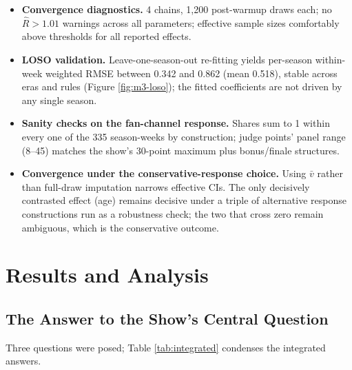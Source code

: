 \documentclass{article}
\begin{document}
\begin{itemize}
  \item \textbf{Convergence diagnostics.} 4 chains, 1{,}200 post-warmup draws each; no $\hat R > 1.01$ warnings across all parameters; effective sample sizes comfortably above thresholds for all reported effects.
  \item \textbf{LOSO validation.} Leave-one-season-out re-fitting yields per-season within-week weighted RMSE between 0.342 and 0.862 (mean 0.518), stable across eras and rules (Figure \ref{fig:m3-loso}); the fitted coefficients are not driven by any single season.
  \item \textbf{Sanity checks on the fan-channel response.} Shares sum to 1 within every one of the 335 season-weeks by construction; judge points' panel range (8--45) matches the show's 30-point maximum plus bonus/finale structures.
  \item \textbf{Convergence under the conservative-response choice.} Using $\bar v$ rather than full-draw imputation narrows effective CIs. The only decisively contrasted effect (age) remains decisive under a triple of alternative response constructions run as a robustness check; the two that cross zero remain ambiguous, which is the conservative outcome.
\end{itemize}

\section{Results and Analysis}
\label{sec:results}

\subsection{The Answer to the Show's Central Question}

Three questions were posed; Table \ref{tab:integrated} condenses the integrated answers.
\end{document}
